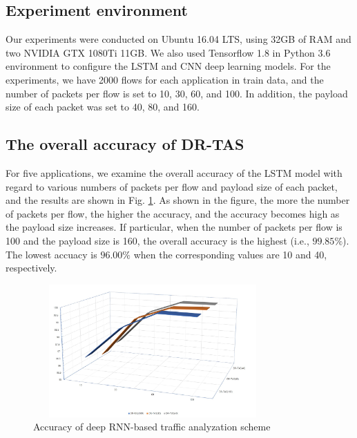 \documentclass[10pt, twoside, jounal]{IEEEtran}
\begin{document}
\subsection{Experiment environment}
Our experiments were conducted on Ubuntu 16.04 LTS, using 32GB of RAM and two NVIDIA GTX 1080Ti 11GB.
We also used Tensorflow 1.8 in Python 3.6 environment to configure the LSTM and CNN deep learning models.
For the experiments, we have 2000 flows for each application in train data, and the number of packets per flow is set
to 10, 30, 60, and 100.
In addition, the payload size of each packet was set to 40, 80, and 160.

\subsection{The overall accuracy of DR-TAS}
For five applications, we examine the overall accuracy of the LSTM model with regard to various numbers of
packets per flow and payload size of each packet, and the results are shown in Fig. \ref{fig3}.
As shown in the figure, the more the number of packets per flow, the higher the accuracy, and the accuracy becomes high as the payload size increases.
If particular, when the number of packets per flow is 100 and the payload size is 160, the overall
accuracy is the highest (i.e., $99.85\%$). The lowest accuacy is $96.00\%$ when the corresponding values are 10 and 40,
respectively.
\begin{figure}[!t]
\centering
\setlength{\abovecaptionskip}{0pt}
\setlength{\belowcaptionskip}{0pt}
{
\includegraphics[width=3.6in, height=2.0in]{fig3.jpg}
\caption{Accuracy of deep RNN-based traffic analyzation scheme}
\label{fig3}
}
\end{figure}
\end{document}
